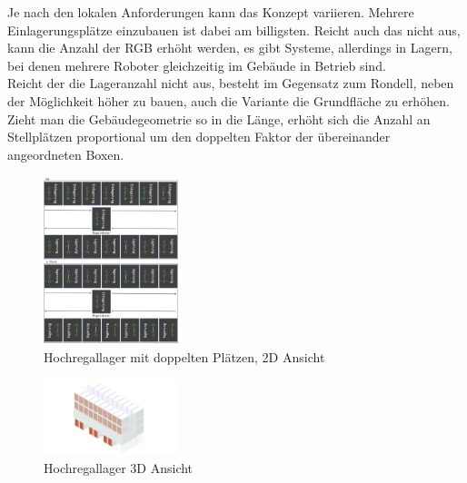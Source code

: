 Je nach den lokalen Anforderungen kann das Konzept variieren. Mehrere Einlagerungsplätze einzubauen ist dabei am billigsten. Reicht auch das nicht aus, kann die Anzahl der RGB erhöht werden, es gibt Systeme, allerdings in Lagern, bei denen mehrere Roboter gleichzeitig im Gebäude in Betrieb sind. \\
Reicht der die Lageranzahl nicht aus, besteht im Gegensatz zum Rondell, neben der Möglichkeit höher zu bauen, auch die Variante die Grundfläche zu erhöhen. Zieht man die Gebäudegeometrie so in die Länge, erhöht sich die Anzahl an Stellplätzen proportional um den doppelten Faktor der übereinander angeordneten Boxen. \\
\begin{figure}[H]
    \centering
    \includegraphics[width=0.35\textwidth]{images/hochregallager2ddoppelt.jpg}
    \caption{Hochregallager mit doppelten Plätzen, 2D Ansicht}
    \label{fig:hochregallager2ddoppelt}
\end{figure}
\begin{figure}[H]
    \centering
    \includegraphics[width=0.35\textwidth]{images/hochregallager3d.png}
    \caption{Hochregallager 3D Ansicht}
    \label{fig:hochregallager3d}
\end{figure}

